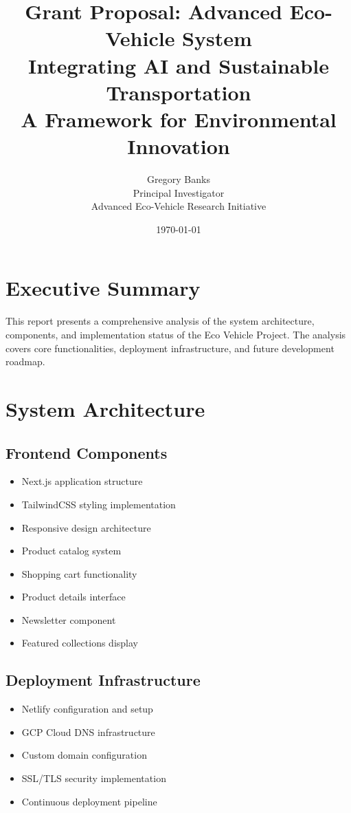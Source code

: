 \documentclass[12pt,a4paper]{article}
\title{Grant Proposal: Advanced Eco-Vehicle System\\[1ex]
Integrating AI and Sustainable Transportation\\[2ex]
\large A Framework for Environmental Innovation}
\author{Gregory Banks\\Principal Investigator\\Advanced Eco-Vehicle Research Initiative}
\date{\today}
\begin{document}
\maketitle
\tableofcontents
\newpage

\section{Executive Summary}
This report presents a comprehensive analysis of the system architecture, components, and implementation status of the Eco Vehicle Project. The analysis covers core functionalities, deployment infrastructure, and future development roadmap.

\section{System Architecture}
\subsection{Frontend Components}
\begin{itemize}
    \item Next.js application structure
    \item TailwindCSS styling implementation
    \item Responsive design architecture
    \item Product catalog system
    \item Shopping cart functionality
    \item Product details interface
    \item Newsletter component
    \item Featured collections display
\end{itemize}

\subsection{Deployment Infrastructure}
\begin{itemize}
    \item Netlify configuration and setup
    \item GCP Cloud DNS infrastructure
    \item Custom domain configuration
    \item SSL/TLS security implementation
    \item Continuous deployment pipeline
\end{itemize}
\end{document}
